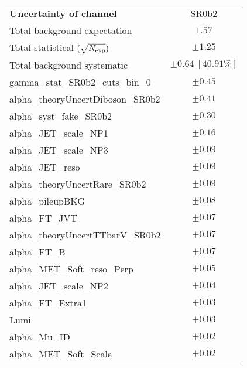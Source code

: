 
\begin{table}
\begin{center}
\setlength{\tabcolsep}{0.0pc}
\begin{tabular*}{\textwidth}{@{\extracolsep{\fill}}lc}
\noalign{\smallskip}\hline\noalign{\smallskip}
{\bf Uncertainty of channel}                                    & SR0b2            \\
\noalign{\smallskip}\hline\noalign{\smallskip}
Total background expectation             &  $1.57$       \\
\noalign{\smallskip}\hline\noalign{\smallskip}
Total statistical $(\sqrt{N_{\rm exp}})$              & $\pm 1.25$       \\
Total background systematic               & $\pm 0.64\ [40.91\%] $             \\
\noalign{\smallskip}\hline\noalign{\smallskip}
\noalign{\smallskip}\hline\noalign{\smallskip}
gamma\_stat\_SR0b2\_cuts\_bin\_0         & $\pm 0.45$       \\
alpha\_theoryUncertDiboson\_SR0b2         & $\pm 0.41$       \\
alpha\_syst\_fake\_SR0b2         & $\pm 0.30$       \\
alpha\_JET\_scale\_NP1         & $\pm 0.16$       \\
alpha\_JET\_scale\_NP3         & $\pm 0.09$       \\
alpha\_JET\_reso         & $\pm 0.09$       \\
alpha\_theoryUncertRare\_SR0b2         & $\pm 0.09$       \\
alpha\_pileupBKG         & $\pm 0.08$       \\
alpha\_FT\_JVT         & $\pm 0.07$       \\
alpha\_theoryUncertTTbarV\_SR0b2         & $\pm 0.07$       \\
alpha\_FT\_B         & $\pm 0.07$       \\
alpha\_MET\_Soft\_reso\_Perp         & $\pm 0.05$       \\
alpha\_JET\_scale\_NP2         & $\pm 0.04$       \\
alpha\_FT\_Extra1         & $\pm 0.03$       \\
Lumi         & $\pm 0.03$       \\
alpha\_Mu\_ID         & $\pm 0.02$       \\
alpha\_MET\_Soft\_Scale         & $\pm 0.02$       \\

\end{tabular*}
\end{center}
\end{table}
